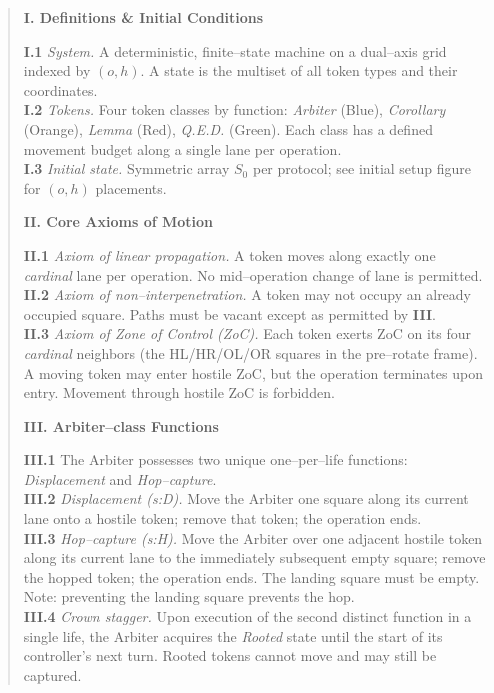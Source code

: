 \documentclass[11pt]{article}
\begin{document}
\begin{quote}\small
\textbf{I. Definitions \& Initial Conditions}

\textbf{I.1} \textit{System.} A deterministic, finite--state machine on a dual--axis grid indexed by $(o,h)$. A state is the multiset of all token types and their coordinates.\\
\textbf{I.2} \textit{Tokens.} Four token classes by function: \emph{Arbiter} (Blue), \emph{Corollary} (Orange), \emph{Lemma} (Red), \emph{Q.E.D.} (Green). Each class has a defined movement budget along a single lane per operation.\\
\textbf{I.3} \textit{Initial state.} Symmetric array $S_0$ per protocol; see initial setup figure for $(o,h)$ placements.

\medskip
\textbf{II. Core Axioms of Motion}

\textbf{II.1} \textit{Axiom of linear propagation.} A token moves along exactly one \emph{cardinal} lane per operation. No mid--operation change of lane is permitted.\\
\textbf{II.2} \textit{Axiom of non--interpenetration.} A token may not occupy an already occupied square. Paths must be vacant except as permitted by \textbf{III}.\\
\textbf{II.3} \textit{Axiom of Zone of Control (ZoC).} Each token exerts ZoC on its four \emph{cardinal} neighbors (the HL/HR/OL/OR squares in the pre--rotate frame). A moving token may enter hostile ZoC, but the operation terminates upon entry. Movement through hostile ZoC is forbidden.

\medskip
\textbf{III. Arbiter--class Functions}

\textbf{III.1} The Arbiter possesses two unique one--per--life functions: \emph{Displacement} and \emph{Hop--capture}.\\
\textbf{III.2} \textit{Displacement (s:D).} Move the Arbiter one square along its current lane onto a hostile token; remove that token; the operation ends.\\
\textbf{III.3} \textit{Hop--capture (s:H).} Move the Arbiter over one adjacent hostile token along its current lane to the immediately subsequent empty square; remove the hopped token; the operation ends. The landing square must be empty. Note: preventing the landing square prevents the hop.\\
\textbf{III.4} \textit{Crown stagger.} Upon execution of the second distinct function in a single life, the Arbiter acquires the \emph{Rooted} state until the start of its controller’s next turn. Rooted tokens cannot move and may still be captured.


\end{quote}
\end{document}

